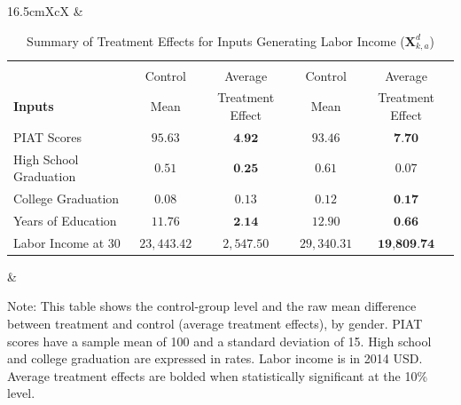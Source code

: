 \begin{table}[!htbpt]
\begin{threeparttable}
\caption{Summary of Treatment Effects for Inputs Generating Labor Income ($\bm{X}^d_{k,a}$)} \label{table:summint}
\centering
\footnotesize
\begin{tabularx}{16.5cm}{XcX}
& \begin{tabular}{lcccc} \toprule
& \mc{2}{c}{Females} & \mc{2}{c}{Males} \\
& Control & Average & Control & Average  \\
\textbf{Inputs} & Mean & Treatment Effect & Mean & Treatment Effect  \\
\midrule
PIAT Scores & $     95.63 $  & $      \textbf{4.92} $ & $     93.46 $ & $      \textbf{7.70} $ \\
High School Graduation & $      0.51 $ & $     \textbf{0.25} $ & $      0.61 $ & $      0.07 $ \\
College Graduation & $      0.08 $ & $      0.13 $ & $      0.12 $ & $      \textbf{0.17} $ \\
Years of Education & $     11.76 $ & $      \textbf{2.14} $ & $     12.90 $ & $      \textbf{0.66} $ \\
Labor Income at 30  & $ 23,443.42 $ & $  2,547.50 $ & $ 29,340.31 $ & $\textbf{19,809.74} $ \\ \bottomrule
\end{tabular} &
\end{tabularx}
\begin{tablenotes}
\footnotesize
\item Note: This table shows the control-group level and the raw mean difference between treatment and control (average treatment effects), by gender. PIAT scores have a sample mean of 100 and a standard deviation of 15. High school and college graduation are expressed in rates. Labor income is in 2014 USD. Average treatment effects are bolded when statistically significant at the 10\% level.
\end{tablenotes}
\end{threeparttable}
\end{table}

